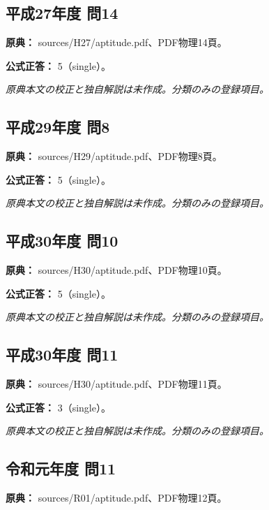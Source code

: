 \subsection{平成27年度 問14}
\label{q:h27-reg-apt-14}

\noindent\textbf{原典：} sources/H27/aptitude.pdf、PDF物理14頁。

\textbf{公式正答：} 5（single）。

\par\textit{原典本文の校正と独自解説は未作成。分類のみの登録項目。}

\subsection{平成29年度 問8}
\label{q:h29-reg-apt-08}

\noindent\textbf{原典：} sources/H29/aptitude.pdf、PDF物理8頁。

\textbf{公式正答：} 5（single）。

\par\textit{原典本文の校正と独自解説は未作成。分類のみの登録項目。}

\subsection{平成30年度 問10}
\label{q:h30-reg-apt-10}

\noindent\textbf{原典：} sources/H30/aptitude.pdf、PDF物理10頁。

\textbf{公式正答：} 5（single）。

\par\textit{原典本文の校正と独自解説は未作成。分類のみの登録項目。}

\subsection{平成30年度 問11}
\label{q:h30-reg-apt-11}

\noindent\textbf{原典：} sources/H30/aptitude.pdf、PDF物理11頁。

\textbf{公式正答：} 3（single）。

\par\textit{原典本文の校正と独自解説は未作成。分類のみの登録項目。}

\subsection{令和元年度 問11}
\label{q:r01-reg-apt-11}

\noindent\textbf{原典：} sources/R01/aptitude.pdf、PDF物理12頁。

